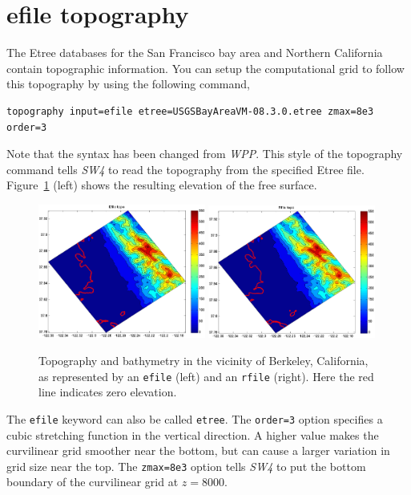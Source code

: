 \documentclass[11pt]{report}
\begin{document}
\section{efile topography}\label{sec:topo-efile}

The Etree databases for the San Francisco bay area and Northern California contain topographic
information. You can setup the computational grid to follow this topography by using the following command,
\begin{verbatim}
topography input=efile etree=USGSBayAreaVM-08.3.0.etree zmax=8e3 order=3
\end{verbatim}
Note that the syntax has been changed from \emph{WPP}. This style of the topography command tells
\emph{SW4} to read the topography from the specified Etree file. Figure~\ref{fig:erfile-topo} (left) shows
the resulting elevation of the free surface. 
%
\begin{figure}[htp]
  \begin{center}
    \includegraphics[width=0.49\textwidth]{figures/efile-topo.png}\hfill
    \includegraphics[width=0.49\textwidth]{figures/rfile-topo.png}
    \caption{Topography and bathymetry in the vicinity of Berkeley, California, as
represented by an {\tt efile} (left) and an {\tt rfile} (right). Here the red line indicates
zero elevation.}
    \label{fig:erfile-topo}
  \end{center}
\end{figure}
%
The \verb+efile+ keyword can also be called \verb+etree+. The \verb+order=3+ option specifies a
cubic stretching function in the vertical direction. A higher value makes the curvilinear grid
smoother near the bottom, but can cause a larger variation in grid size near the top. The
\verb+zmax=8e3+ option tells \emph{SW4} to put the bottom boundary of the curvilinear grid at
$z=8000$.
\end{document}
